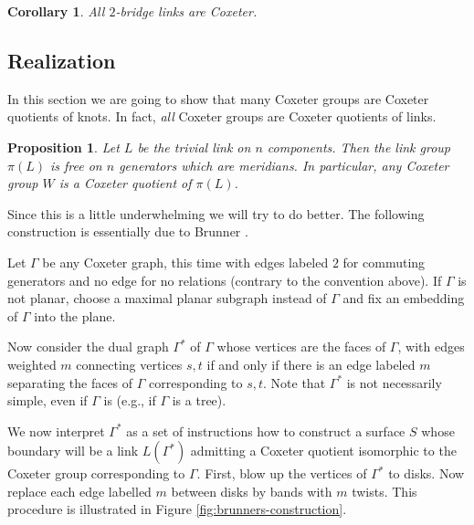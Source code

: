 \documentclass{article}
\newtheorem{corollary}[theorem]{Corollary}
\newtheorem{proposition}[theorem]{Proposition}
\theoremstyle{definition}
\begin{document}
\begin{corollary}
All $2$-bridge links are Coxeter.
\end{corollary}

\subsection{Realization}
In this section we are going to show that many Coxeter groups are Coxeter quotients of knots. In fact, \textit{all} Coxeter groups are Coxeter quotients of links.

\begin{proposition}\label{prop:trivial-realization}
Let $L$ be the trivial link on $n$ components. Then the link group $\pi(L)$ is free on $n$ generators which are meridians. In particular, any Coxeter group $W$ is a Coxeter quotient of $\pi(L)$.
\end{proposition}

Since this is a little underwhelming we will try to do better. The following construction is essentially due to Brunner \cite{brunner1992}.

Let $\Gamma$ be any Coxeter graph, this time with edges labeled $2$ for commuting generators and no edge for no relations (contrary to the convention above). If $\Gamma$ is not planar, choose a maximal planar subgraph instead of $\Gamma$ and fix an embedding of $\Gamma$ into the plane.

Now consider the dual graph $\Gamma^*$ of $\Gamma$ whose vertices are the faces of $\Gamma$, with edges weighted $m$ connecting vertices $s, t$ if and only if there is an edge labeled $m$ separating the faces of $\Gamma$ corresponding to $s, t$. Note that $\Gamma^*$ is not necessarily simple, even if $\Gamma$ is (e.g., if $\Gamma$ is a tree).

We now interpret $\Gamma^*$ as a set of instructions how to construct a surface $S$ whose boundary will be a link $L(\Gamma^*)$ admitting a Coxeter quotient isomorphic to the Coxeter group corresponding to $\Gamma$. First, blow up the vertices of $\Gamma^*$ to disks. Now replace each edge labelled $m$ between disks by bands with $m$ twists. This procedure is illustrated in Figure \ref{fig:brunners-construction}.
\end{document}
